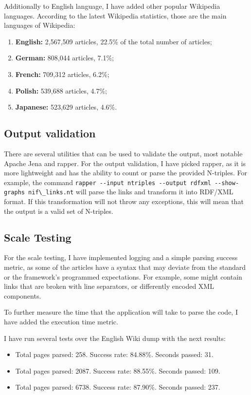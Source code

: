\documentclass[thesis=M,english,hidelinks]{FITthesis}[2019/12/23]
\begin{document}
{Additionally to English language, I have added other popular Wikipedia languages. According to the latest Wikipedia statistics, those are the main languages of Wikipedia\cite{top_ten_wikis}:

\begin{enumerate}
	\item \textbf{English:} 2,567,509 articles, 22.5\% of the total number of articles;
	\item \textbf{German:} 808,044 articles, 7.1\%;
	\item \textbf{French:} 709,312 articles, 6.2\%;
	\item \textbf{Polish:} 539,688 articles, 4.7\%;
	\item \textbf{Japanese:} 523,629 articles, 4.6\%.
\end{enumerate}


\subsection{Output validation}

There are several utilities that can be used to validate the output, most notable Apache Jena and rapper\cite{rapper_utility}. For the output validation, I have picked rapper, as it is more lightweight and has the ability to count or parse the provided N-triples. For example, the command \lstinline{rapper --input ntriples --output rdfxml --show-graphs nif\_links.nt} will parse the links and transform it into RDF/XML format. If this transformation will not throw any exceptions, this will mean that the output is a valid set of N-triples.

\subsection{Scale Testing}

For the scale testing, I have implemented logging and a simple parsing success metric, as some of the articles have a syntax that may deviate from the standard or the framework's programmed expectations. For example, some might contain links that are broken with line separators, or differently encoded XML components. 

To further measure the time that the application will take to parse the code, I have added the execution time metric.

I have run several tests over the English Wiki dump with the next results:

\begin{itemize}
	\item Total pages parsed: 258. Success rate: 84.88\%. Seconds passed: 31.
	\item Total pages parsed: 2087. Success rate: 88.55\%. Seconds passed: 109.
	\item Total pages parsed: 6738. Success rate: 87.90\%. Seconds passed: 237.
\end{itemize}

}
\end{document}
